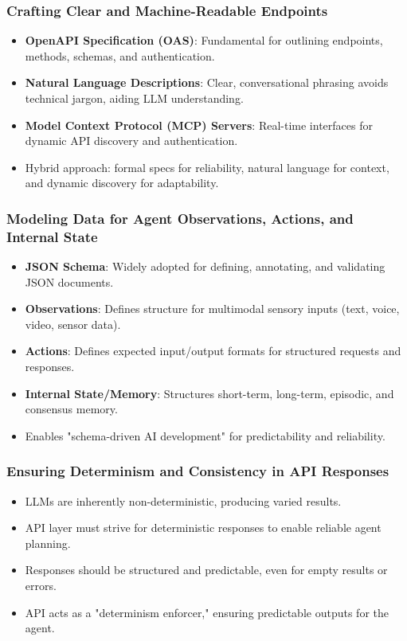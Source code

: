 \documentclass{beamer}       %
\begin{document}
\begin{frame}
    \frametitle{Crafting Clear and Machine-Readable Endpoints}
    \begin{itemize}
        \item \textbf{OpenAPI Specification (OAS)}: Fundamental for outlining endpoints, methods, schemas, and authentication.
        \item \textbf{Natural Language Descriptions}: Clear, conversational phrasing avoids technical jargon, aiding LLM understanding.
        \item \textbf{Model Context Protocol (MCP) Servers}: Real-time interfaces for dynamic API discovery and authentication.
        \item Hybrid approach: formal specs for reliability, natural language for context, and dynamic discovery for adaptability.
    \end{itemize}
\end{frame}

\begin{frame}
    \frametitle{Modeling Data for Agent Observations, Actions, and Internal State}
    \begin{itemize}
        \item \textbf{JSON Schema}: Widely adopted for defining, annotating, and validating JSON documents.
        \item \textbf{Observations}: Defines structure for multimodal sensory inputs (text, voice, video, sensor data).
        \item \textbf{Actions}: Defines expected input/output formats for structured requests and responses.
        \item \textbf{Internal State/Memory}: Structures short-term, long-term, episodic, and consensus memory.
        \item Enables "schema-driven AI development" for predictability and reliability.
    \end{itemize}
\end{frame}

\begin{frame}
    \frametitle{Ensuring Determinism and Consistency in API Responses}
    \begin{itemize}
        \item LLMs are inherently non-deterministic, producing varied results.
        \item API layer must strive for deterministic responses to enable reliable agent planning.
        \item Responses should be structured and predictable, even for empty results or errors.
        \item API acts as a "determinism enforcer," ensuring predictable outputs for the agent.
    \end{itemize}
\end{frame}
\end{document}
